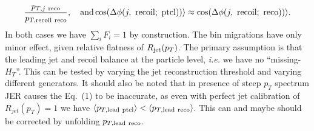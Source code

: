 \documentclass[landscape,10pt]{beamer} %
\begin{document}
{\begin{equation}
\frac{p_{T,j~\rm reco}}{p_{T,\rm recoil~reco}}, \quad {\rm and}
\cos(\Delta\phi({j,~\rm recoil;~ptcl}))\rangle \approx
\cos(\Delta\phi({j,~\rm recoil;~reco}))\rangle.
\end{equation}
In both cases we have $\sum_i F_i = 1$ by construction. The bin migrations have only minor effect, given relative flatness of $R_{\rm jet}(p_T)$.
The primary assumption is that the leading jet and recoil balance at the particle level, {\em i.e.} we have no ``missing-$H_T$''. This can be tested by varying the jet reconstruction threshold and varying different generators. It should also be noted that in presence of steep $p_T$ spectrum JER causes the Eq.~(1) to be inaccurate, as even with perfect jet calibration of $R_{jet}(p_T)=1$ we have $\langle p_{T,\rm lead~ptcl}\rangle < \langle p_{T,\rm lead~reco}\rangle$. This can and maybe should be corrected by unfolding $p_{T,\rm lead~reco}$.
} %
\end{document}
